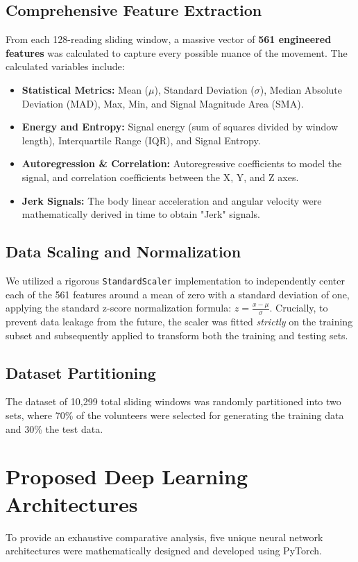 \documentclass[12pt,a4paper]{article}
\begin{document}
\subsection{Comprehensive Feature Extraction}
From each 128-reading sliding window, a massive vector of \textbf{561 engineered features} was calculated to capture every possible nuance of the movement. The calculated variables include:
\begin{itemize}
    \item \textbf{Statistical Metrics:} Mean ($\mu$), Standard Deviation ($\sigma$), Median Absolute Deviation (MAD), Max, Min, and Signal Magnitude Area (SMA).
    \item \textbf{Energy and Entropy:} Signal energy (sum of squares divided by window length), Interquartile Range (IQR), and Signal Entropy.
    \item \textbf{Autoregression \& Correlation:} Autoregressive coefficients to model the signal, and correlation coefficients between the X, Y, and Z axes.
    \item \textbf{Jerk Signals:} The body linear acceleration and angular velocity were mathematically derived in time to obtain "Jerk" signals.
\end{itemize}

\subsection{Data Scaling and Normalization}
We utilized a rigorous \texttt{StandardScaler} implementation to independently center each of the 561 features around a mean of zero with a standard deviation of one, applying the standard z-score normalization formula: $ z = \frac{x - \mu}{\sigma} $. Crucially, to prevent data leakage from the future, the scaler was fitted \textit{strictly} on the training subset and subsequently applied to transform both the training and testing sets.

\subsection{Dataset Partitioning}
The dataset of 10,299 total sliding windows was randomly partitioned into two sets, where 70\% of the volunteers were selected for generating the training data and 30\% the test data.

\newpage
\section{Proposed Deep Learning Architectures}
To provide an exhaustive comparative analysis, five unique neural network architectures were mathematically designed and developed using PyTorch. 
\end{document}

